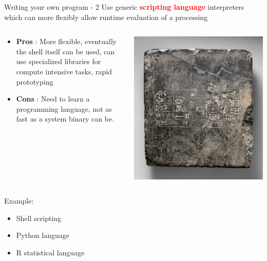\documentclass[unknownkeysallowed, 10pt, a4 paper, handout]{beamer}
\begin{document}
\begin{frame}[label=scripting]{Writing your own program - 2}
  Use generic \textcolor{red}{\textbf{scripting language}} interpreters which
  can more flexibly allow runtime evaluation of a processing
  \begin{columns}[T]
    \begin{column}{.66\textwidth}
      \begin{itemize}
        \item \textbf{Pros} : More flexible, eventually the shell itself can be
          used, can use specialized libraries for compute intensive tasks,
          rapid prototyping
        \item \textbf{Cons} : Need to learn a programming language, not as
          fast as a system binary can be.
      \end{itemize}
    \end{column}
    \hfill
    \begin{column}{.33\textwidth}
      \vspace{10pt}
      \includegraphics[scale=0.07]{pics/cuneiform.jpg}
    \end{column}
  \end{columns}
  Example:
  \begin{itemize}
    \item Shell scripting
    \item Python language
    \item R statistical language
  \end{itemize}
\end{frame}
\end{document}
